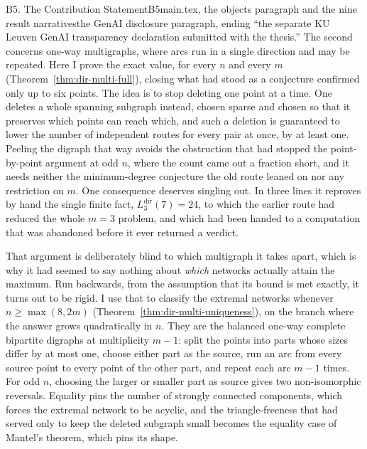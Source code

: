 \begin{offcutrewrite}{B5. The Contribution Statement}{B5}{main.tex, the objects paragraph and the nine result narratives}{the GenAI disclosure paragraph, ending ``the separate KU Leuven GenAI transparency declaration submitted with the thesis.''}
The second concerns one-way multigraphs, where arcs run in a single direction and may be repeated. Here I prove the exact value, for every $n$ and every $m$ (Theorem~\ref{thm:dir-multi-full}), closing what had stood as a conjecture confirmed only up to six points. The idea is to stop deleting one point at a time. One deletes a whole spanning subgraph instead, chosen sparse and chosen so that it preserves which points can reach which, and such a deletion is guaranteed to lower the number of independent routes for every pair at once, by at least one. Peeling the digraph that way avoids the obstruction that had stopped the point-by-point argument at odd $n$, where the count came out a fraction short, and it needs neither the minimum-degree conjecture the old route leaned on nor any restriction on $m$. One consequence deserves singling out. In three lines it reproves by hand the single finite fact, $L_3^{\mathrm{dir}}(7)=24$, to which the earlier route had reduced the whole $m=3$ problem, and which had been handed to a computation that was abandoned before it ever returned a verdict.

That argument is deliberately blind to which multigraph it takes apart, which is why it had seemed to say nothing about \emph{which} networks actually attain the maximum. Run backwards, from the assumption that its bound is met exactly, it turns out to be rigid. I use that to classify the extremal networks whenever $n \ge \max(8, 2m)$ (Theorem~\ref{thm:dir-multi-uniqueness}), on the branch where the answer grows quadratically in $n$. They are the balanced one-way complete bipartite digraphs at multiplicity $m-1$: split the points into parts whose sizes differ by at most one, choose either part as the source, run an arc from every source point to every point of the other part, and repeat each arc $m-1$ times. For odd $n$, choosing the larger or smaller part as source gives two non-isomorphic reversals. Equality pins the number of strongly connected components, which forces the extremal network to be acyclic, and the triangle-freeness that had served only to keep the deleted subgraph small becomes the equality case of Mantel's theorem, which pins its shape.


\end{offcutrewrite}

